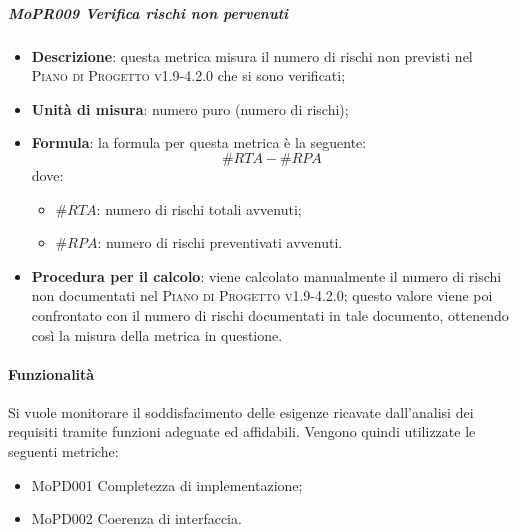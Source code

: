 \documentclass[../norme-di-progetto.tex]{subfiles}
\begin{document}
\subparagraph{MoPR009 Verifica rischi non pervenuti}
\begin{itemize}
  \item \textbf{Descrizione}: questa metrica misura il numero di rischi non previsti nel \textsc{Piano di Progetto v1.9-4.2.0} che si sono verificati;
  \item \textbf{Unità di misura}: numero puro (numero di rischi);
  \item \textbf{Formula}: la formula per questa metrica è la seguente:
  \begin{displaymath}
    \#RTA - \#RPA
  \end{displaymath}
  dove:
  \begin{itemize}
    \item $ \#RTA $: numero di rischi totali avvenuti;
    \item $ \#RPA $: numero di rischi preventivati avvenuti.
  \end{itemize}
    \item \textbf{Procedura per il calcolo}: viene calcolato manualmente il numero di rischi non documentati nel \textsc{Piano di Progetto v1.9-4.2.0}; questo valore viene poi confrontato con il numero di rischi documentati in tale documento, ottenendo così la misura della metrica in questione.
\end{itemize}


\paragraph{Funzionalità}
Si vuole monitorare il soddisfacimento delle esigenze ricavate dall'analisi dei requisiti tramite funzioni adeguate ed affidabili. Vengono quindi utilizzate le seguenti metriche:
\begin{itemize}
  \item MoPD001 Completezza di implementazione;
  \item MoPD002 Coerenza di interfaccia.
\end{itemize}
\end{document}
